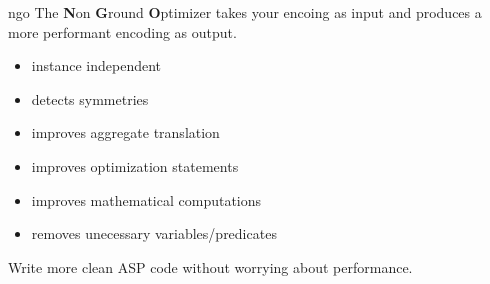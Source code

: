 \begin{frame}{ngo}
The \textbf{N}on \textbf{G}round \textbf{O}ptimizer takes your encoing as input
and produces a more performant encoding as output.
  \begin{itemize}
  \item instance independent
  \item detects symmetries
  \item improves aggregate translation
  \item improves optimization statements
  \item improves mathematical computations
  \item removes unecessary variables/predicates
  \end{itemize}
Write more clean ASP code without worrying about performance.
\end{frame}
%
